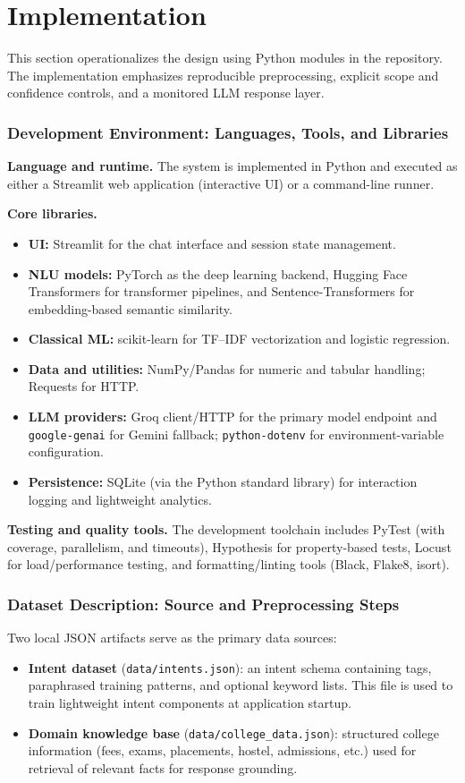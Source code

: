 \documentclass[12pt,onecolumn]{report}
\begin{document}
\chapter{Implementation}
This section operationalizes the design using Python modules in the repository. The implementation emphasizes reproducible preprocessing, explicit scope and confidence controls, and a monitored LLM response layer.

\subsection{Development Environment: Languages, Tools, and Libraries}
\textbf{Language and runtime.} The system is implemented in Python and executed as either a Streamlit web application (interactive UI) or a command-line runner.

\textbf{Core libraries.}
\begin{itemize}
	\item \textbf{UI:} Streamlit for the chat interface and session state management.
	\item \textbf{NLU models:} PyTorch as the deep learning backend, Hugging Face Transformers for transformer pipelines, and Sentence-Transformers for embedding-based semantic similarity.
	\item \textbf{Classical ML:} scikit-learn for TF--IDF vectorization and logistic regression.
	\item \textbf{Data and utilities:} NumPy/Pandas for numeric and tabular handling; Requests for HTTP.
	\item \textbf{LLM providers:} Groq client/HTTP for the primary model endpoint and \texttt{google-genai} for Gemini fallback; \texttt{python-dotenv} for environment-variable configuration.
	\item \textbf{Persistence:} SQLite (via the Python standard library) for interaction logging and lightweight analytics.
\end{itemize}

\textbf{Testing and quality tools.} The development toolchain includes PyTest (with coverage, parallelism, and timeouts), Hypothesis for property-based tests, Locust for load/performance testing, and formatting/linting tools (Black, Flake8, isort).

\subsection{Dataset Description: Source and Preprocessing Steps}
Two local JSON artifacts serve as the primary data sources:
\begin{itemize}
	\item \textbf{Intent dataset} (\texttt{data/intents.json}): an intent schema containing tags, paraphrased training patterns, and optional keyword lists. This file is used to train lightweight intent components at application startup.
	\item \textbf{Domain knowledge base} (\texttt{data/college\_data.json}): structured college information (fees, exams, placements, hostel, admissions, etc.) used for retrieval of relevant facts for response grounding.
\end{itemize}
\end{document}
